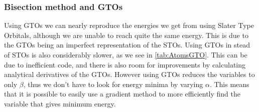 		\subsubsection{Bisection method and GTOs}

		Using GTOs we can nearly reproduce the energies we get from using Slater Type Orbitals, although we are unable to reach quite the same energy. This is due to the GTOs being an imperfect representation of the STOs. Using GTOs in stead of STOs is also considerably slower, as we see in \ref{tab:AtomsGTO}. This can be due to inefficient code, and there is also room for improvements by calculating analytical derivatives of the GTOs. However using GTOs reduces the variables to only $\beta$, thus we don't have to look for energy minima by varying $\alpha$. This means that it is possible to easily use a gradient method to more efficiently find the variable that gives minimum energy.

		